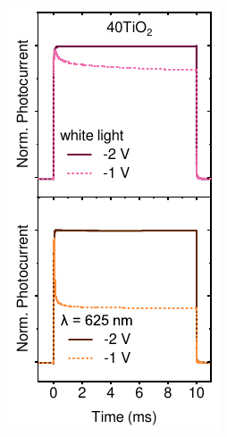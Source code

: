 \begin{figure}[htbp]
    \centering
    \begin{subfigure}{0.24\textwidth}
        \centering
        \includegraphics[width=\textwidth]{chapters/transport_layers/images/TPC_40TiO2.pdf}
        \caption{}

\end{subfigure}
\end{figure}
